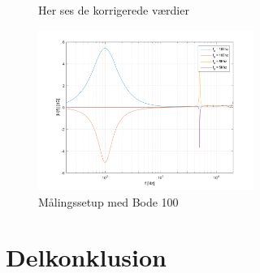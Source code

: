 \begin{figure}[h!]
	\centering
  	\caption{Her ses de korrigerede værdier}
	\label{fig:gain}
\end{figure}

\begin{figure}[h!]\label{fig:Frekvensplacering_med_hotfix}
	\centering
	\includegraphics[width=7cm]{billeder/Frekvensplacering_Med_hotfix}
	\caption{Målingssetup med Bode 100}
\end{figure}

\section{Delkonklusion}



